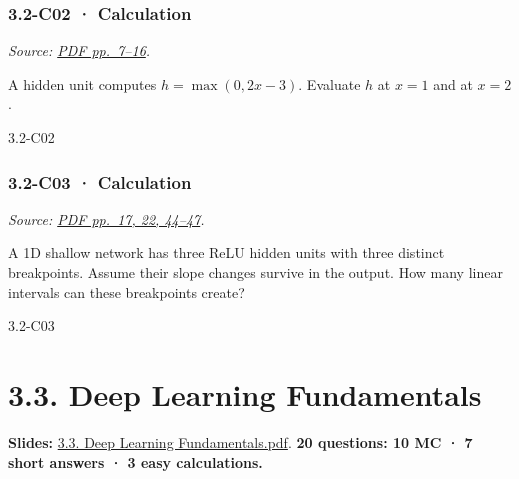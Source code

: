 \noindent\begin{minipage}{\linewidth}

\subsubsection{3.2-C02 · Calculation}\label{c02-calculation-8}

\emph{Source:
\href{../Lecture\%20Slides/3.2.\%20Shallow\%20NN.pdf\#page=7}{PDF
pp.~7--16}.}

A hidden unit computes \(h=\max(0,2x-3)\). Evaluate \(h\) at \(x=1\) and
at \(x=2\).

\begin{solution}[26mm]{3.2-C02}

\end{solution}
\end{minipage}\par\medskip

\noindent\begin{minipage}{\linewidth}

\subsubsection{3.2-C03 · Calculation}\label{c03-calculation-8}

\emph{Source:
\href{../Lecture\%20Slides/3.2.\%20Shallow\%20NN.pdf\#page=17}{PDF
pp.~17, 22, 44--47}.}

A 1D shallow network has three ReLU hidden units with three distinct
breakpoints. Assume their slope changes survive in the output. How many
linear intervals can these breakpoints create?

\begin{solution}[26mm]{3.2-C03}

\end{solution}
\end{minipage}\par\medskip

\clearpage

\section{3.3. Deep Learning
Fundamentals}\label{deep-learning-fundamentals}

\textbf{Slides:}
\href{../Lecture\%20Slides/3.3.\%20Deep\%20Learning\%20Fundamentals.pdf}{3.3.
Deep Learning Fundamentals.pdf}. \textbf{20 questions: 10 MC · 7 short
answers · 3 easy calculations.}

